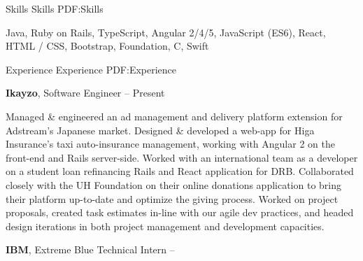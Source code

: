 \documentclass[letterpaper,MMMyyyy,nonstopmode]{simpleresumecv}
\newcommand{\CVWebpage}{deanbr.io}
\begin{document}



\begin{Body}


\Section
{Skills}
{Skills}
{PDF:Skills}

\Entry
\begin{large}
Java,
Ruby on Rails,
TypeScript,
Angular 2/4/5,
JavaScript (ES6),
React,
HTML / CSS,
Bootstrap,
Foundation,
C,
Swift
\end{large}



\BigGap
\Section
{Experience}
{Experience}
{PDF:Experience}

\Entry
\begin{large}
{\textbf{Ikayzo}},
Software Engineer
\hfill
{} --
Present

\Gap
\BulletItem
Managed \& engineered an ad management and delivery platform extension for Adstream's Japanese market.
\BulletItem
Designed \& developed a web-app for Higa Insurance's taxi auto-insurance management, working with Angular 2 on the front-end and Rails server-side.
\BulletItem
Worked with an international team as a developer on a student loan refinancing Rails and React application for DRB.
\BulletItem
Collaborated closely with the UH Foundation on their online donations application to bring their platform up-to-date and optimize the giving process.
\BulletItem
Worked on project proposals, created task estimates in-line with our agile dev practices, and headed design iterations in both project management and development capacities.
\end{large}

\BigGap
\Entry
\begin{large}
{\textbf{IBM}},
Extreme Blue Technical Intern
\hfill
{} --


\end{large}
\end{Body}
\end{document}
